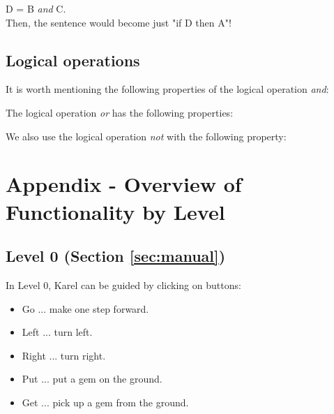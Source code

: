 \noindent
D = B {\em and} C.\\

\noindent
Then, the sentence would become just "if D then A"! 

\subsection{Logical operations}

It is worth mentioning the following properties of the logical operation {\em and}:\\

\begin{center}
\end{center}
\vspace{4mm}
\noindent
The logical operation {\em or} has the following properties:\\

\begin{center}
\end{center}
\vspace{4mm}
\noindent
We also use the logical operation {\em not} with the following property:\\

\begin{center}
\end{center}


\section{Appendix - Overview of Functionality by Level}\label{sec:newfunc3}

\subsection{Level 0 (Section \ref{sec:manual})}

In Level 0, Karel can be guided by clicking on buttons:
\begin{itemize}
\item Go ... make one step forward.
\item Left ... turn left.
\item Right ... turn right.
\item Put ... put a gem on the ground.
\item Get ... pick up a gem from the ground.
\end{itemize}

